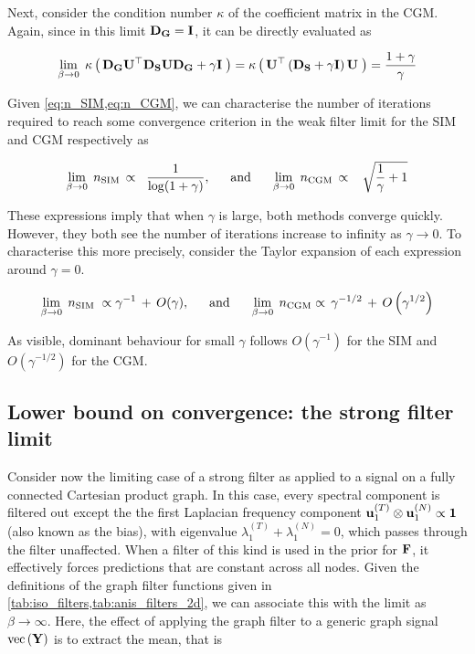 Next, consider the condition number $\kappa$ of the coefficient matrix in the CGM. Again, since in this limit $\mathbf{D}_{\mathbf{G}} = \mathbf{I}$, it can be directly evaluated as 


\begin{equation}
    \lim_{\beta \rightarrow 0} \; \kappa \left(  \, \mathbf{D}_{\mathbf{G}} \mathbf{U}^\top \mathbf{D}_{\mathbf{S}} \mathbf{U} \mathbf{D}_{\mathbf{G}} + \gamma \mathbf{I} \; \right)
    = \kappa  \left(  \, \mathbf{U}^\top \left( \mathbf{D}_{\mathbf{S}} + \gamma \mathbf{I} \right) \mathbf{U} \; \right)
    = \frac{1 + \gamma}{\gamma}
\end{equation}

 Given \cref{eq:n_SIM,eq:n_CGM}, we can characterise the number of iterations required to reach some convergence criterion in the weak filter limit for the SIM and CGM respectively as

 \begin{equation}
    \label{eq:n_WFL}
    \lim_{\beta \rightarrow 0} \;  n_\text{SIM} \, \propto \;\;  \frac{1}{\log(1 + \gamma)}, \;\;  \quad \text{and} \quad  \;\; \lim_{\beta \rightarrow 0} \;  n_\text{CGM} \, \propto \;\;\;  \sqrt{\frac{1}{\gamma} + 1}
 \end{equation}

These expressions imply that when $\gamma$ is large, both methods converge quickly. However, they both see the number of iterations increase to infinity as $\gamma \rightarrow 0$. To characterise this more precisely, consider the Taylor expansion of each expression around $\gamma = 0$.  

\begin{equation}
    \lim_{\beta \rightarrow 0} \;  n_\text{SIM}  \;  \propto \gamma^{-1} \, + \, O(\gamma), \;\; \quad \text{and} \quad \;\; \lim_{\beta \rightarrow 0} \;  n_\text{CGM} \propto \, \gamma^{-1/2} \, + \, O\left(\gamma^{1/2}\right) 
\end{equation}


As visible, dominant behaviour for small $\gamma$ follows $O(\gamma^{-1})$ for the SIM and $O(\gamma^{-1/2})$ for the CGM.

\subsection{Lower bound on convergence: the strong filter limit}

Consider now the limiting case of a strong filter as applied to a signal on a fully connected Cartesian product graph. In this case, every spectral component is filtered out except the the first Laplacian frequency component $\mathbf{u}_1^{(T)} \otimes \mathbf{u}_1^{(N)}   \propto \mathbf{1}$ (also known as the bias), with eigenvalue $\lambda_1^{(T)} + \lambda_1^{(N)} = 0$, which passes through the filter unaffected. When a filter of this kind is used in the prior for $\mathbf{F}$, it effectively forces predictions that are constant across all nodes. Given the definitions of the graph filter functions given in \cref{tab:iso_filters,tab:anis_filters_2d}, we can associate this with the limit as $\beta \rightarrow \infty$. Here, the effect of applying the graph filter to a generic graph signal $\text{\textup{vec}}\left(\mathbf{Y}\right)$ is to extract the mean, that is 

